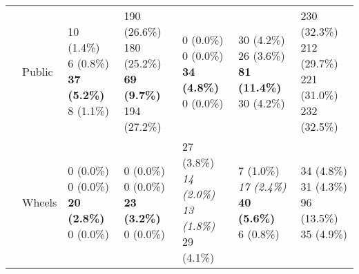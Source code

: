 \documentclass[10pt]{article}
\begin{document}
\begin{table}
\begin{center}
\begin{small}
\begin{tabular}{lllllll}
& Public      &  \makecell[l]{\textnormal{10 (1.4\%)} \\\textnormal{6 (0.8\%)} \\\textbf{37 (5.2\%)} \\\textnormal{8 (1.1\%)}}      &  \makecell[l]{\textnormal{190 (26.6\%)} \\\textnormal{180 (25.2\%)} \\\textbf{69 (9.7\%)} \\\textnormal{194 (27.2\%)}}      &  \makecell[l]{\textnormal{0 (0.0\%)} \\\textnormal{0 (0.0\%)} \\\textbf{34 (4.8\%)} \\\textnormal{0 (0.0\%)}}      &  \makecell[l]{\textnormal{30 (4.2\%)} \\\textnormal{26 (3.6\%)} \\\textbf{81 (11.4\%)} \\\textnormal{30 (4.2\%)}}      & \makecell[l]{230 (32.3\%) \\212 (29.7\%) \\221 (31.0\%) \\232 (32.5\%) \\} \\ \cline{2-7}
& Wheels      &  \makecell[l]{\textnormal{0 (0.0\%)} \\\textnormal{0 (0.0\%)} \\\textbf{20 (2.8\%)} \\\textnormal{0 (0.0\%)}}      &  \makecell[l]{\textnormal{0 (0.0\%)} \\\textnormal{0 (0.0\%)} \\\textbf{23 (3.2\%)} \\\textnormal{0 (0.0\%)}}      &  \makecell[l]{\textnormal{27 (3.8\%)} \\\textit{14 (2.0\%)} \\\textit{13 (1.8\%)} \\\textnormal{29 (4.1\%)}}      &  \makecell[l]{\textnormal{7 (1.0\%)} \\\textit{17 (2.4\%)} \\\textbf{40 (5.6\%)} \\\textnormal{6 (0.8\%)}}      & \makecell[l]{34 (4.8\%) \\31 (4.3\%) \\96 (13.5\%) \\35 (4.9\%) \\} \\ \cline{2-7}

\end{tabular}
\end{small}
\end{center}
\end{table}
\end{document}
